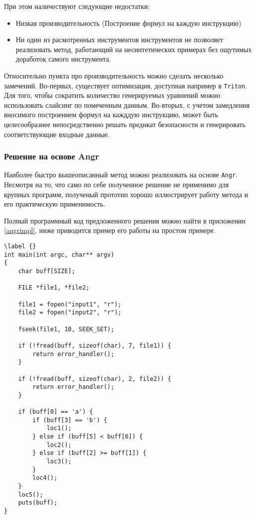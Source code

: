При этом наличествуют следующие недостатки:
\begin{itemize}
  \item Низкая производительность (Построение формул на каждую инструкцию)
  \item Ни один из расмотренных инструментов инструментов не позволяет реализовать метод, работающий на несинтетических примерах без ощутимых доработок самого инструмента.
\end{itemize}

Относительно пункта про производительность можно сделать несколько замечений.
Во-первых, существует оптимизация, доступная например в \texttt{Triton}. Для того, чтобы сократить количество генерируемых уравнений можно использовать слайсинг по помеченным данным.
Во-вторых, с учетом замедления вносимого построением формул на кажддую инструкцию, может быть целесообразнее непосредственно решать предикат безопасности и генерировать соответствующие входные данные.

\subsubsection{Решение на основе Angr}

Наиболее быстро вышеописанный метод можно реализовать на основе \texttt{Angr}. Несмотря на то, что само по себе полученное решение не применимо для крупных программ, полученый прототип хорошо иллюстрирует работу метода и его практическую применимость.

Полный программный код предложенного решения можно найти в приложении \ref{angrimpl}, ниже приводится пример его работы на простом примере.

\begin{lstlisting}[environoment=C_LANG, caption=jumper.c, label={lst:jumper}, captionpos=b]
\label {}
int main(int argc, char** argv)
{
    char buff[SIZE];

    FILE *file1, *file2;

    file1 = fopen("input1", "r");
    file2 = fopen("input2", "r");

    fseek(file1, 10, SEEK_SET);

    if (!fread(buff, sizeof(char), 7, file1)) {
        return error_handler();
    }

    if (!fread(buff, sizeof(char), 2, file2)) {
        return error_handler();
    }

    if (buff[0] == 'a') {
        if (buff[3] == 'b') {
            loc1();
        } else if (buff[5] < buff[6]) {
            loc2();
        } else if (buff[2] >= buff[1]) {
            loc3();
        }
        loc4();
    }
    loc5();
    puts(buff);
}
\end{lstlisting}


